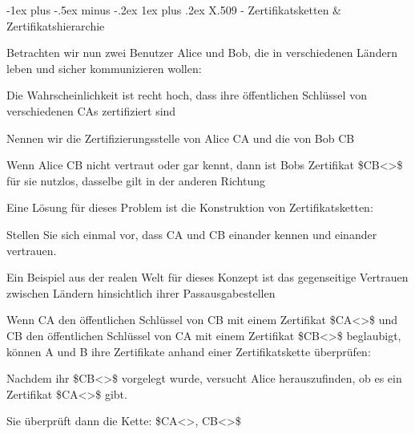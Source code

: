 \documentclass[a4paper]{article}
\makeatletter
\renewcommand{\subsubsection}{\@startsection{subsubsection}{3}{0mm}%
 {-1ex plus -.5ex minus -.2ex}%
 {1ex plus .2ex}%
 {\normalfont\small\bfseries}}
\makeatother
\begin{document}
\begin{multicols}{3}
      \subsubsection{X.509 - Zertifikatsketten \&
            Zertifikatshierarchie}

      \begin{itemize*}
            \item Betrachten wir nun zwei Benutzer Alice und Bob, die in verschiedenen
            Ländern leben und sicher kommunizieren wollen:
            \begin{itemize*}
                  \item Die Wahrscheinlichkeit ist recht hoch, dass ihre öffentlichen Schlüssel von verschiedenen CAs zertifiziert sind
                  \item Nennen wir die Zertifizierungsstelle von Alice CA und die von Bob CB
                  \item Wenn Alice CB nicht vertraut oder gar kennt, dann ist Bobs Zertifikat \$CB\textless{}\textgreater\$ für sie nutzlos, dasselbe gilt in der anderen Richtung
            \end{itemize*}
            \item Eine Lösung für dieses Problem ist die Konstruktion von
            Zertifikatsketten:
            \begin{itemize*}
                  \item Stellen Sie sich einmal vor, dass CA und CB einander kennen und einander vertrauen.
                  \begin{itemize*} \item Ein Beispiel aus der realen Welt für dieses Konzept ist das gegenseitige Vertrauen zwischen Ländern hinsichtlich ihrer Passausgabestellen \end{itemize*}
                  \item Wenn CA den öffentlichen Schlüssel von CB mit einem Zertifikat \$CA\textless{}\textgreater\$ und CB den öffentlichen Schlüssel von CA mit einem Zertifikat \$CB\textless{}\textgreater\$ beglaubigt, können A und B ihre Zertifikate anhand einer Zertifikatskette überprüfen:
                  \begin{itemize*} \item Nachdem ihr \$CB\textless{}\textgreater\$ vorgelegt wurde, versucht Alice herauszufinden, ob es ein Zertifikat \$CA\textless{}\textgreater\$ gibt. \item Sie überprüft dann die Kette: \$CA\textless{}\textgreater, CB\textless{}\textgreater\$ \end{itemize*}

\end{itemize*}
\end{itemize*}
\end{multicols}
\end{document}
